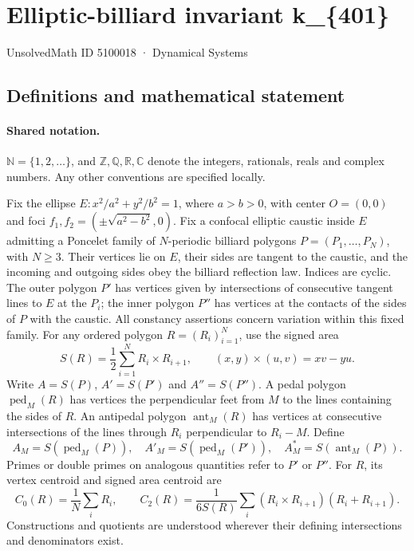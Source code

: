 \documentclass[11pt]{article}
\begin{document}
\setcounter{section}{5100017}
\section{Elliptic-billiard invariant k\_\{401\}}\label{5100018}
{\small\sffamily UnsolvedMath ID 5100018 · Dynamical Systems}
\subsection{Definitions and mathematical statement}

\paragraph{Shared notation.}$\mathbb N=\{1,2,\ldots\}$, and $\mathbb Z,\mathbb Q,\mathbb R,\mathbb C$ denote the integers, rationals, reals and complex numbers. Any other conventions are specified locally.


Fix the ellipse $E:x^2/a^2+y^2/b^2=1$, where $a>b>0$, with center $O=(0,0)$ and foci $f_1,f_2=(\pm\sqrt{a^2-b^2},0)$. Fix a confocal elliptic caustic inside $E$ admitting a Poncelet family of $N$-periodic billiard polygons $P=(P_1,\ldots,P_N)$, with $N\geq3$. Their vertices lie on $E$, their sides are tangent to the caustic, and the incoming and outgoing sides obey the billiard reflection law. Indices are cyclic. The outer polygon $P'$ has vertices given by intersections of consecutive tangent lines to $E$ at the $P_i$; the inner polygon $P''$ has vertices at the contacts of the sides of $P$ with the caustic. All constancy assertions concern variation within this fixed family.
For any ordered polygon $R=(R_i)_{i=1}^N$, use the signed area
\[S(R)=\frac12\sum_{i=1}^N R_i\times R_{i+1},\qquad (x,y)\times(u,v)=xv-yu.\]
Write $A=S(P)$, $A'=S(P')$ and $A''=S(P'')$. A pedal polygon $\operatorname{ped}_M(R)$ has vertices the perpendicular feet from $M$ to the lines containing the sides of $R$. An antipedal polygon $\operatorname{ant}_M(R)$ has vertices at consecutive intersections of the lines through $R_i$ perpendicular to $R_i-M$. Define
\[A_M=S(\operatorname{ped}_M(P)),\quad A'_M=S(\operatorname{ped}_M(P')),\quad A_M^*=S(\operatorname{ant}_M(P)).\]
Primes or double primes on analogous quantities refer to $P'$ or $P''$. For $R$, its vertex centroid and signed area centroid are
\[C_0(R)=\frac1N\sum_i R_i,\qquad C_2(R)=\frac{1}{6S(R)}\sum_i(R_i\times R_{i+1})(R_i+R_{i+1}).\]
Constructions and quotients are understood wherever their defining intersections and denominators exist.
\end{document}
